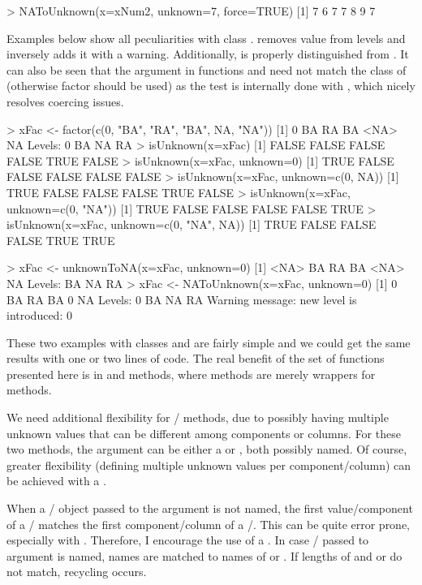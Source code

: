 \documentclass[a4paper]{report}
\begin{document}
\begin{article}
\begin{smallverbatim}
> NAToUnknown(x=xNum2, unknown=7, force=TRUE)
[1] 7 6 7 7 8 9 7
\end{smallverbatim}

Examples below show all peculiarities with class .
 removes  value from levels and inversely
 adds it with a warning. Additionally,  is
properly distinguished from . It can also be seen that the argument
 in functions  and  need
not match the class of  (otherwise factor should be used) as the test
is internally done with , which nicely resolves coercing
issues.

\begin{smallverbatim}
> xFac <- factor(c(0, "BA", "RA", "BA", NA, "NA"))
[1] 0    BA   RA   BA   <NA> NA
Levels: 0 BA NA RA
> isUnknown(x=xFac)
[1] FALSE FALSE FALSE FALSE  TRUE FALSE
> isUnknown(x=xFac, unknown=0)
[1]  TRUE FALSE FALSE FALSE FALSE FALSE
> isUnknown(x=xFac, unknown=c(0, NA))
[1]  TRUE FALSE FALSE FALSE  TRUE FALSE
> isUnknown(x=xFac, unknown=c(0, "NA"))
[1]  TRUE FALSE FALSE FALSE FALSE  TRUE
> isUnknown(x=xFac, unknown=c(0, "NA", NA))
[1]  TRUE FALSE FALSE FALSE  TRUE  TRUE

> xFac <- unknownToNA(x=xFac, unknown=0)
[1] <NA> BA   RA   BA   <NA> NA
Levels: BA NA RA
> xFac <- NAToUnknown(x=xFac, unknown=0)
[1] 0  BA RA BA 0  NA
Levels: 0 BA NA RA
Warning message:
new level is introduced: 0
\end{smallverbatim}

These two examples with classes  and  are fairly simple and we
could get the same results with one or two lines of \R{} code. The real
benefit of the set of functions presented here is in  and
 methods, where  methods are merely
wrappers for  methods.

We need additional flexibility for / methods,
due to possibly having multiple unknown values that can be different
among  components or  columns. For these two
methods, the argument  can be either a  or
, both possibly named. Of course, greater flexibility (defining
multiple unknown values per component/column) can be achieved with
a .

When a / object passed to the argument  is not
named, the first value/component of a / matches the first
component/column of a /. This can be quite
error prone, especially with . Therefore, I encourage the use of
a . In case / passed to argument
 is named, names are matched to names of  or
. If lengths of  and  or
 do not match, recycling occurs.


\end{article}
\end{document}
